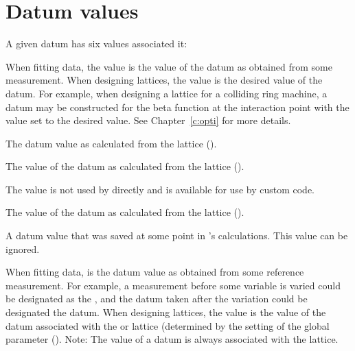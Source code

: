 \section{Datum values}
\label{s:datum.values}

A given datum has six values associated it:
\vspace{-2ex}
\begin{description}
  \vspace{-1ex}
  \item[meas] \Newline 
When fitting data, the  value is the value of the datum as obtained from some
measurement. When designing lattices, the  value is the desired value of the datum. For
example, when designing a lattice for a colliding ring machine, a datum may be constructed for 
the beta function at the interaction point with the  value set to the desired value. See
Chapter~\ref{c:opti} for more details.
  \vspace{-1ex}
  \item[base] \Newline
The datum value as calculated from the  lattice ().
  \vspace{-0.5ex}
  \item[design] \Newline
The value of the datum as calculated from the  lattice ().
  \vspace{-0.5ex}
  \item[fit] \Newline
The  value is not used by \tao directly and is available for use by custom code.
  \vspace{-0.5ex}
  \item[model] \Newline
The value of the datum as calculated from the  lattice ().
  \vspace{-0.5ex}
  \item[old] \Newline
A datum value that was saved at some point in \tao's calculations. This value
can be ignored.
  \vspace{-0.5ex}
  \item[ref] \Newline
When fitting data,  is the datum value as obtained from some reference measurement. For
example, a measurement before some variable is varied could be designated as the , and
the datum taken after the variation could be designated the  datum. When designing
lattices, the  value is the value of the datum associated with the  or 
lattice (determined by the setting of the global  parameter
(). Note: The  value of a datum is always associated with the
 lattice.
\end{description}

